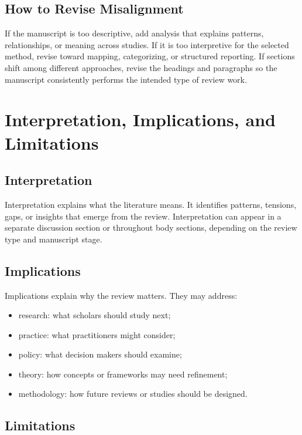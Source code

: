 \documentclass[11pt]{article}
\begin{document}
\subsection{How to Revise Misalignment}

If the manuscript is too descriptive, add analysis that explains patterns, relationships, or meaning across studies. If it is too interpretive for the selected method, revise toward mapping, categorizing, or structured reporting. If sections shift among different approaches, revise the headings and paragraphs so the manuscript consistently performs the intended type of review work.

\section{Interpretation, Implications, and Limitations}

\subsection{Interpretation}

Interpretation explains what the literature means. It identifies patterns, tensions, gaps, or insights that emerge from the review. Interpretation can appear in a separate discussion section or throughout body sections, depending on the review type and manuscript stage.

\subsection{Implications}

Implications explain why the review matters. They may address:

\begin{itemize}
  \item research: what scholars should study next;
  \item practice: what practitioners might consider;
  \item policy: what decision makers should examine;
  \item theory: how concepts or frameworks may need refinement;
  \item methodology: how future reviews or studies should be designed.
\end{itemize}

\subsection{Limitations}
\end{document}
